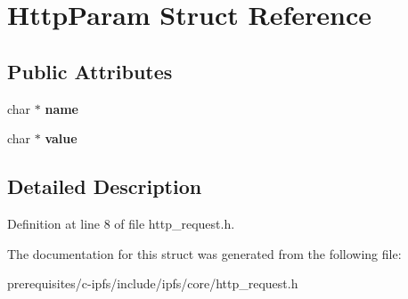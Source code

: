 \hypertarget{struct_http_param}{}\section{Http\+Param Struct Reference}
\label{struct_http_param}
\subsection*{Public Attributes}
\begin{DoxyCompactItemize}
\item 
\mbox{\label{struct_http_param_ab77d3a136bf1ef4f4513f193c8577a60}} 
char $\ast$ {\bfseries name}
\item 
\mbox{\label{struct_http_param_af4d8557506dbf2f0706c31ddcb9bc990}} 
char $\ast$ {\bfseries value}
\end{DoxyCompactItemize}


\subsection{Detailed Description}


Definition at line 8 of file http\+\_\+request.\+h.



The documentation for this struct was generated from the following file\+:\begin{DoxyCompactItemize}
\item 
prerequisites/c-\/ipfs/include/ipfs/core/http\+\_\+request.\+h\end{DoxyCompactItemize}
